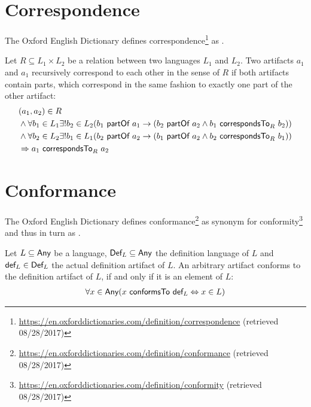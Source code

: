 \section{Correspondence}
The Oxford English Dictionary defines correspondence\footnote{\url{https://en.oxforddictionaries.com/definition/correspondence} (retrieved 08/28/2017)} as .
\cite{DBLP:conf/sle/Lammel16}

\begin{definition}[Correspondence]
Let $R \subseteq L_1 \times L_2$ be a relation between two languages $L_1$ and $L_2$.
Two artifacts $a_1$ and $a_1$ recursively correspond to each other in the sense of $R$ if both artifacts contain parts, which correspond in the same fashion to exactly one part of the other artifact:
\begin{align}
\begin{split}
&(a_1,a_2) \in R
\\&\wedge \forall b_1 \in L_1 \exists! b_2 \in L_2 
(b_1 ~\textsf{partOf}~ a_1 \rightarrow (b_2 ~\textsf{partOf}~ a_2 \wedge b_1 ~\textsf{correspondsTo}_{R}~ b_2))
\\&\wedge \forall b_2 \in L_2 \exists! b_1 \in L_1 
(b_2 ~\textsf{partOf}~ a_2 \rightarrow ( b_1 ~\textsf{partOf}~ a_2 \wedge b_2 ~\textsf{correspondsTo}_{R}~ b_1))
\\&\Rightarrow a_1 ~\textsf{correspondsTo}_{R}~ a_2
\end{split}
\end{align}
\end{definition}




\section{Conformance}
The Oxford English Dictionary defines conformance\footnote{\url{https://en.oxforddictionaries.com/definition/conformance} (retrieved 08/28/2017)} as synonym for conformity\footnote{\url{https://en.oxforddictionaries.com/definition/conformity} (retrieved 08/28/2017)} and thus in turn as .

\cite{DBLP:conf/sle/Lammel16}
\begin{definition}[Conformance]
Let $L \subseteq \textsf{Any}$ be a language, $\textsf{Def}_{L} \subseteq \textsf{Any}$ the definition language of $L$ and $\textsf{def}_L \in \textsf{Def}_{L}$ the actual definition artifact of $L$.
An arbitrary artifact conforms to the definition artifact of $L$, if and only if it is an element of $L$:
\begin{align}
\forall x \in \textsf{Any} 
(x ~\textsf{conformsTo}~ \textsf{def}_L \Leftrightarrow x \in L)
\end{align}
\end{definition}
